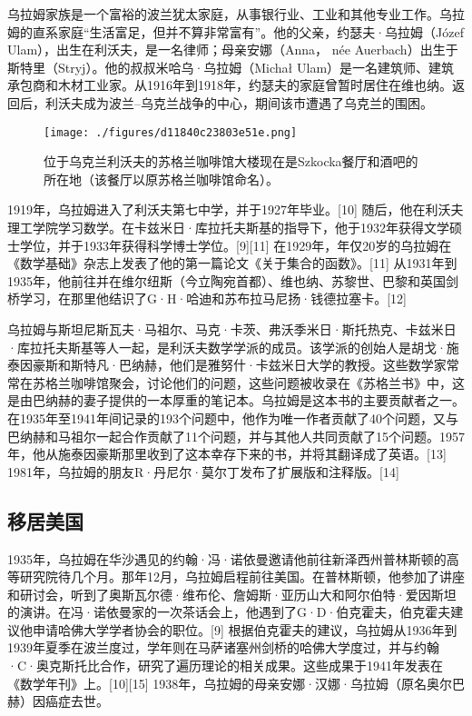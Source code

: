 乌拉姆家族是一个富裕的波兰犹太家庭，从事银行业、工业和其他专业工作。乌拉姆的直系家庭“生活富足，但并不算非常富有”。他的父亲，约瑟夫·乌拉姆（Józef Ulam），出生在利沃夫，是一名律师；母亲安娜（Anna， née Auerbach）出生于斯特里（Stryj）。他的叔叔米哈乌·乌拉姆（Michał Ulam）是一名建筑师、建筑承包商和木材工业家。从1916年到1918年，约瑟夫的家庭曾暂时居住在维也纳。返回后，利沃夫成为波兰–乌克兰战争的中心，期间该市遭遇了乌克兰的围困。
\begin{figure}[ht]
\centering
\texttt{[image: ./figures/d11840c23803e51e.png]}
\caption{位于乌克兰利沃夫的苏格兰咖啡馆大楼现在是Szkocka餐厅和酒吧的所在地（该餐厅以原苏格兰咖啡馆命名）。} \label{fig_Ulam_2}
\end{figure}
1919年，乌拉姆进入了利沃夫第七中学，并于1927年毕业。[10] 随后，他在利沃夫理工学院学习数学。在卡兹米日·库拉托夫斯基的指导下，他于1932年获得文学硕士学位，并于1933年获得科学博士学位。[9][11] 在1929年，年仅20岁的乌拉姆在《数学基础》杂志上发表了他的第一篇论文《关于集合的函数》。[11] 从1931年到1935年，他前往并在维尔纽斯（今立陶宛首都）、维也纳、苏黎世、巴黎和英国剑桥学习，在那里他结识了G·H·哈迪和苏布拉马尼扬·钱德拉塞卡。[12]

乌拉姆与斯坦尼斯瓦夫·马祖尔、马克·卡茨、弗沃季米日·斯托热克、卡兹米日·库拉托夫斯基等人一起，是利沃夫数学学派的成员。该学派的创始人是胡戈·施泰因豪斯和斯特凡·巴纳赫，他们是雅努什·卡兹米日大学的教授。这些数学家常常在苏格兰咖啡馆聚会，讨论他们的问题，这些问题被收录在《苏格兰书》中，这是由巴纳赫的妻子提供的一本厚重的笔记本。乌拉姆是这本书的主要贡献者之一。在1935年至1941年间记录的193个问题中，他作为唯一作者贡献了40个问题，又与巴纳赫和马祖尔一起合作贡献了11个问题，并与其他人共同贡献了15个问题。1957年，他从施泰因豪斯那里收到了这本幸存下来的书，并将其翻译成了英语。[13] 1981年，乌拉姆的朋友R·丹尼尔·莫尔丁发布了扩展版和注释版。[14]
\subsection{移居美国}  
1935年，乌拉姆在华沙遇见的约翰·冯·诺依曼邀请他前往新泽西州普林斯顿的高等研究院待几个月。那年12月，乌拉姆启程前往美国。在普林斯顿，他参加了讲座和研讨会，听到了奥斯瓦尔德·维布伦、詹姆斯·亚历山大和阿尔伯特·爱因斯坦的演讲。在冯·诺依曼家的一次茶话会上，他遇到了G·D·伯克霍夫，伯克霍夫建议他申请哈佛大学学者协会的职位。[9] 根据伯克霍夫的建议，乌拉姆从1936年到1939年夏季在波兰度过，学年则在马萨诸塞州剑桥的哈佛大学度过，并与约翰·C·奥克斯托比合作，研究了遍历理论的相关成果。这些成果于1941年发表在《数学年刊》上。[10][15] 1938年，乌拉姆的母亲安娜·汉娜·乌拉姆（原名奥尔巴赫）因癌症去世。

